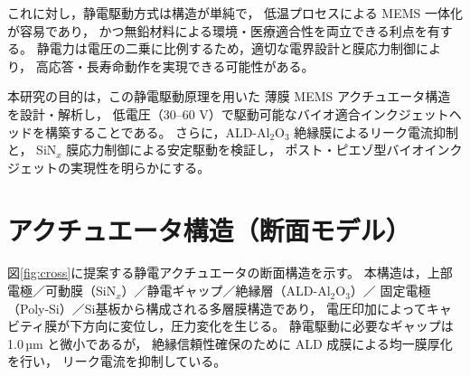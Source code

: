 \documentclass[conference]{IEEEtran}
\begin{document}
これに対し，静電駆動方式は構造が単純で，
低温プロセスによる MEMS 一体化が容易であり，
かつ無鉛材料による環境・医療適合性を両立できる利点を有する。
静電力は電圧の二乗に比例するため，適切な電界設計と膜応力制御により，
高応答・長寿命動作を実現できる可能性がある。

本研究の目的は，この静電駆動原理を用いた
薄膜 MEMS アクチュエータ構造を設計・解析し，
低電圧（30–60 V）で駆動可能なバイオ適合インクジェットヘッドを構築することである。
さらに，ALD-Al$_2$O$_3$ 絶縁膜によるリーク電流抑制と，
SiN$_x$ 膜応力制御による安定駆動を検証し，
ポスト・ピエゾ型バイオインクジェットの実現性を明らかにする。

\section{アクチュエータ構造（断面モデル）}
図\ref{fig:cross}に提案する静電アクチュエータの断面構造を示す。
本構造は，上部電極／可動膜（SiN$_x$）／静電ギャップ／絶縁層（ALD-Al$_2$O$_3$）／
固定電極（Poly-Si）／Si基板から構成される多層膜構造であり，
電圧印加によってキャビティ膜が下方向に変位し，圧力変化を生じる。
静電駆動に必要なギャップは 1.0\,µm と微小であるが，
絶縁信頼性確保のために ALD 成膜による均一膜厚化を行い，
リーク電流を抑制している。
\end{document}
